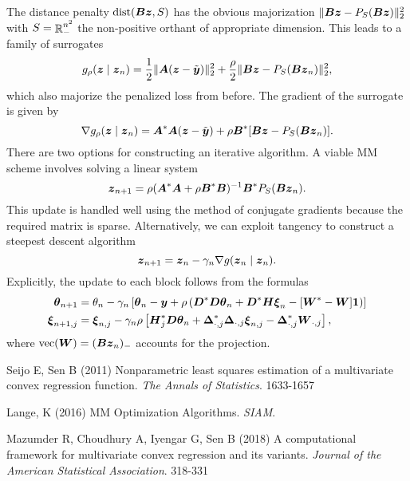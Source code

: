 \documentclass{article}
\begin{document}
The distance penalty \(\mathop{\rm dist}\nolimits(\boldsymbol{B} \boldsymbol{z}, S)\) has the obvious majorization \(\|\boldsymbol{B} \boldsymbol{z} - P_{S}(\boldsymbol{B} \boldsymbol{z})\|^{2}_{2}\) with \(S = \mathop{\mathbb{R}}\nolimits^{n^{2}}_{-}\) the non-positive orthant of appropriate dimension.
This leads to a family of surrogates
\begin{equation*}
    g_{\rho}(\boldsymbol{z} \mid \boldsymbol{z}_{n})
    =
    \frac{1}{2} \|\boldsymbol{A} (\boldsymbol{z} - \tilde{\boldsymbol{y}})\|_{2}^{2}
    +
    \frac{\rho}{2} \|\boldsymbol{B} \boldsymbol{z} - P_{S}(\boldsymbol{B} \boldsymbol{z}_{n})\|^{2}_{2},
\end{equation*}
which also majorize the penalized loss from before.
The gradient of the surrogate is given by
\begin{equation*}
    \nabla g_{\rho}(\boldsymbol{z} \mid \boldsymbol{z}_{n})
    =
    \boldsymbol{A}^{\ast} \boldsymbol{A} (\boldsymbol{z} - \tilde{\boldsymbol{y}})
    +
    \rho \boldsymbol{B}^{\ast}[\boldsymbol{B} \boldsymbol{z} - P_{S}(\boldsymbol{B} \boldsymbol{z}_{n})].
\end{equation*}
There are two options for constructing an iterative algorithm.
A viable MM scheme involves solving a linear system
\begin{equation*}
    \boldsymbol{z}_{n+1}
    =
    \rho (\boldsymbol{A}^{\ast} \boldsymbol{A} + \rho \boldsymbol{B}^{\ast} \boldsymbol{B})^{-1}
    \boldsymbol{B}^{\ast} P_{S}(\boldsymbol{B} \boldsymbol{z}_{n}).
\end{equation*}
This update is handled well using the method of conjugate gradients because the required matrix is sparse.
Alternatively, we can exploit tangency to construct a steepest descent algorithm
\begin{equation*}
    \boldsymbol{z}_{n+1}
    =
    \boldsymbol{z}_{n} - \gamma_{n} \nabla g(\boldsymbol{z}_{n} \mid \boldsymbol{z}_{n}).
\end{equation*}
Explicitly, the update to each block follows from the formulas
\begin{align*}
    \boldsymbol{\theta}_{n+1}
    &=
    \theta_{n} - \gamma_{n}\left[
        \boldsymbol{\theta}_{n} - \boldsymbol{y}
        + \rho \left(\boldsymbol{D}^{\ast} \boldsymbol{D} \boldsymbol{\theta}_{n}
        + \boldsymbol{D}^{\ast} \boldsymbol{H} \boldsymbol{\xi}_{n} - [\boldsymbol{W}^{\ast} -\boldsymbol{W}] \boldsymbol{1}
        \right)
    \right] \\
    \boldsymbol{\xi}_{n+1,j}
    &=
    \boldsymbol{\xi}_{n,j} - \gamma_{n} \rho \left[
        \boldsymbol{H}_{j}^{\ast} \boldsymbol{D} \boldsymbol{\theta}_{n}
        + \boldsymbol{\Delta}_{\cdot,j}^{\ast} \boldsymbol{\Delta}_{\cdot,j} \boldsymbol{\xi}_{n,j} - \boldsymbol{\Delta}_{\cdot,j}^{\ast} \boldsymbol{W}_{\cdot,j}
    \right],
\end{align*}
where \(\mathop{\rm vec}\nolimits(\boldsymbol{W}) = (\boldsymbol{B} \boldsymbol{z}_{n})_{-}\) accounts for the projection.


\begin{thebibliography}{99}
    Seijo E, Sen B (2011) {Nonparametric least squares estimation of a multivariate convex regression function}. {\it The Annals of Statistics}. 1633-1657
    
    Lange, K (2016) {MM Optimization Algorithms}. {\it SIAM}.

    Mazumder R, Choudhury A, Iyengar G, Sen B (2018) {A computational framework for multivariate convex regression and its variants}. {\it Journal of the American Statistical Association}. 318-331
\end{thebibliography}
\end{document}
